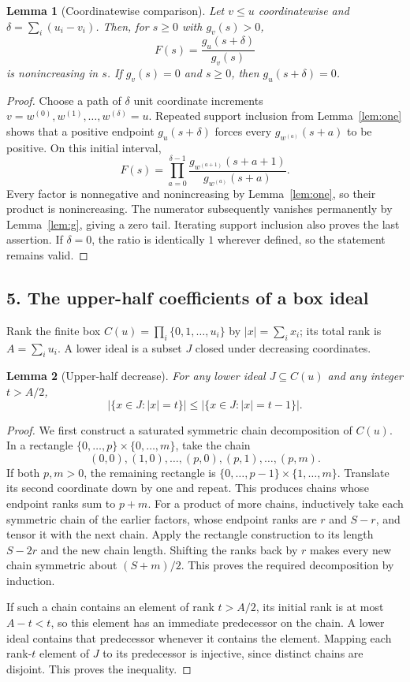 \documentclass[11pt]{article}
\newtheorem{lemma}{Lemma}
\begin{document}
\begin{lemma}[Coordinatewise comparison]\label{lem:many}
Let $v\le u$ coordinatewise and $\delta=\sum_i(u_i-v_i)$. Then, for
$s\ge0$ with $g_v(s)>0$,
\begin{equation}\label{eq:many}
 F(s)=\frac{g_u(s+\delta)}{g_v(s)}
\end{equation}
is nonincreasing in $s$. If $g_v(s)=0$ and $s\ge0$, then
$g_u(s+\delta)=0$.
\end{lemma}
\begin{proof}
Choose a path of $\delta$ unit coordinate increments
$v=w^{(0)},w^{(1)},\ldots,w^{(\delta)}=u$. Repeated support inclusion
from Lemma~\ref{lem:one} shows that a positive endpoint
$g_u(s+\delta)$ forces every $g_{w^{(a)}}(s+a)$ to be positive. On this
initial interval,
\[
 F(s)=\prod_{a=0}^{\delta-1}
 \frac{g_{w^{(a+1)}}(s+a+1)}{g_{w^{(a)}}(s+a)}.
\]
Every factor is nonnegative and nonincreasing by Lemma~\ref{lem:one},
so their product is nonincreasing. The numerator subsequently vanishes
permanently by Lemma~\ref{lem:g}, giving a zero tail. Iterating support
inclusion also proves the last assertion. If $\delta=0$, the ratio is
identically $1$ wherever defined, so the statement remains valid.
\end{proof}

\subsection*{5. The upper-half coefficients of a box ideal}
Rank the finite box
$C(u)=\prod_i\{0,1,\ldots,u_i\}$ by $|x|=\sum_i x_i$; its total rank
is $A=\sum_i u_i$. A lower ideal is a subset $J$ closed under decreasing
coordinates.

\begin{lemma}[Upper-half decrease]\label{lem:tail}
For any lower ideal $J\subseteq C(u)$ and any integer $t>A/2$,
\[
 |\{x\in J:|x|=t\}|\le |\{x\in J:|x|=t-1\}|.
\]
\end{lemma}
\begin{proof}
We first construct a saturated symmetric chain decomposition of $C(u)$.
In a rectangle $\{0,\ldots,p\}\times\{0,\ldots,m\}$, take the chain
\[
 (0,0),(1,0),\ldots,(p,0),(p,1),\ldots,(p,m).
\]
If both $p,m>0$, the remaining rectangle is
$\{0,\ldots,p-1\}\times\{1,\ldots,m\}$. Translate its second coordinate
down by one and repeat. This produces chains whose endpoint ranks sum
to $p+m$. For a product of more chains, inductively take each symmetric
chain of the earlier factors, whose endpoint ranks are $r$ and $S-r$,
and tensor it with the next chain. Apply the rectangle construction to
its length $S-2r$ and the new chain length. Shifting the ranks back by
$r$ makes every new chain symmetric about $(S+m)/2$. This proves the
required decomposition by induction.

If such a chain contains an element of rank $t>A/2$, its initial rank is
at most $A-t<t$, so this element has an immediate predecessor on the
chain. A lower ideal contains that predecessor whenever it contains the
element. Mapping each rank-$t$ element of $J$ to its predecessor is
injective, since distinct chains are disjoint. This proves the inequality.
\end{proof}
\end{document}
